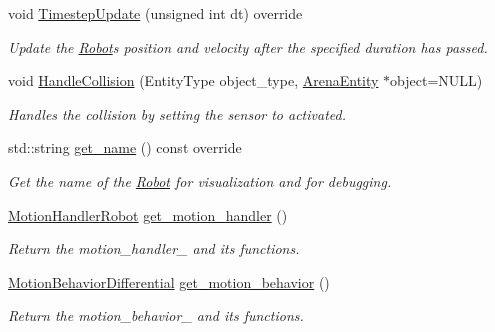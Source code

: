 \begin{DoxyCompactItemize}
void \mbox{\hyperlink{class_robot_ae790462f8782efcfd26082eedec30ed5}{Timestep\+Update}} (unsigned int dt) override
\begin{DoxyCompactList}\small\item\em Update the \mbox{\hyperlink{class_robot}{Robot}}\textquotesingle{}s position and velocity after the specified duration has passed. \end{DoxyCompactList}\item 
\mbox{\label{class_robot_a176a9958cc2ea1e585ddb2cdc82c0bdb}} 
void \mbox{\hyperlink{class_robot_a176a9958cc2ea1e585ddb2cdc82c0bdb}{Handle\+Collision}} (Entity\+Type object\+\_\+type, \mbox{\hyperlink{class_arena_entity}{Arena\+Entity}} $\ast$object=N\+U\+LL)
\begin{DoxyCompactList}\small\item\em Handles the collision by setting the sensor to activated. \end{DoxyCompactList}\item 
\mbox{\label{class_robot_a3f77c13705b8f60480d21d8d936dc39e}} 
std\+::string \mbox{\hyperlink{class_robot_a3f77c13705b8f60480d21d8d936dc39e}{get\+\_\+name}} () const override
\begin{DoxyCompactList}\small\item\em Get the name of the \mbox{\hyperlink{class_robot}{Robot}} for visualization and for debugging. \end{DoxyCompactList}\item 
\mbox{\label{class_robot_a77d37cf0058d18b7f633202e8c1bf814}} 
\mbox{\hyperlink{class_motion_handler_robot}{Motion\+Handler\+Robot}} \mbox{\hyperlink{class_robot_a77d37cf0058d18b7f633202e8c1bf814}{get\+\_\+motion\+\_\+handler}} ()
\begin{DoxyCompactList}\small\item\em Return the motion\+\_\+handler\+\_\+ and its functions. \end{DoxyCompactList}\item 
\mbox{\label{class_robot_ab45bf3c6fdafcd14cdbdb2a8e3f558b8}} 
\mbox{\hyperlink{class_motion_behavior_differential}{Motion\+Behavior\+Differential}} \mbox{\hyperlink{class_robot_ab45bf3c6fdafcd14cdbdb2a8e3f558b8}{get\+\_\+motion\+\_\+behavior}} ()
\begin{DoxyCompactList}\small\item\em Return the motion\+\_\+behavior\+\_\+ and its functions. \end{DoxyCompactList}\item 

\end{DoxyCompactItemize}
